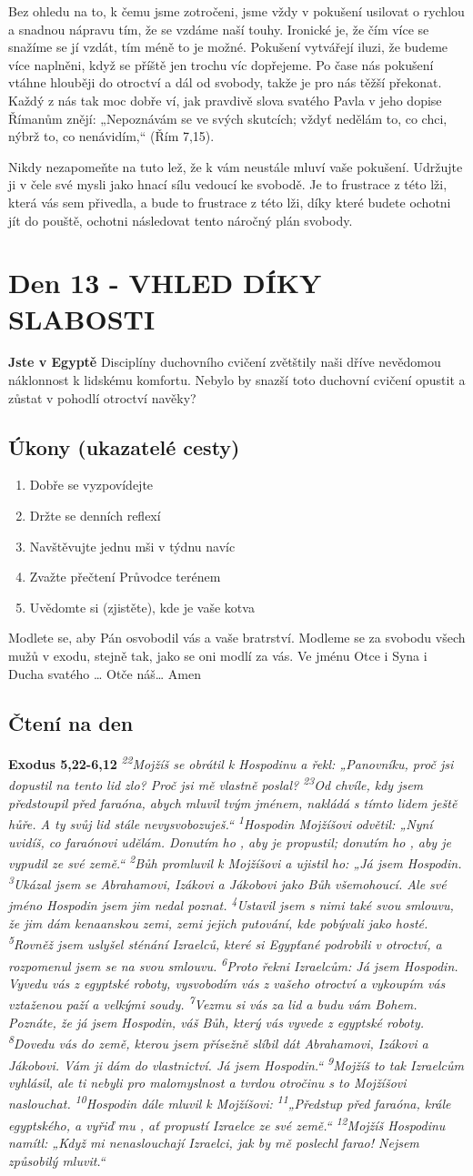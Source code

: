 \documentclass[11pt]{article}
\newcommand{\zacatekDruhyTyden}{
  \textbf{Jste v Egyptě} \newline
  Disciplíny duchovního cvičení zvětštily naši dříve nevědomou náklonnost k lidskému komfortu.
  Nebylo by snazší toto duchovní cvičení opustit a zůstat v pohodlí otroctví navěky?

  \subsection*{Úkony (ukazatelé cesty)}
\begin{enumerate}
  \item Dobře se vyzpovídejte
  \item Držte se denních reflexí
  \item Navštěvujte jednu mši v týdnu navíc
  \item Zvažte přečtení Průvodce terénem
  \item Uvědomte si (zjistěte), kde je vaše kotva
\end{enumerate}
Modlete se, aby Pán osvobodil vás a vaše bratrství. \newline
Modleme se za svobodu všech mužů v exodu, stejně tak, jako se oni modlí za vás.\newline
Ve jménu Otce i Syna i Ducha svatého …  Otče náš… Amen
}
\begin{document}
Bez ohledu na to, k čemu jsme zotročeni, jsme vždy v pokušení usilovat o rychlou a snadnou nápravu tím, že se
vzdáme naší touhy. Ironické je, že čím více se snažíme se jí vzdát, tím méně to je možné. Pokušení vytvářejí iluzi,
že budeme více naplněni, když se příště jen trochu víc dopřejeme. Po čase nás pokušení vtáhne hlouběji do otroctví
a dál od svobody, takže je pro nás těžší překonat. Každý z nás tak moc dobře ví, jak pravdivě slova svatého Pavla v
jeho dopise Římanům znějí: „Nepoznávám se ve svých skutcích; vždyť nedělám to, co chci, nýbrž to, co
nenávidím,“ (Řím 7,15).

Nikdy nezapomeňte na tuto lež, že k vám neustále mluví vaše pokušení. Udržujte ji v čele své mysli jako hnací sílu
vedoucí ke svobodě. Je to frustrace z této lži, která vás sem přivedla, a bude to frustrace z této lži, díky které budete
ochotni jít do pouště, ochotni následovat tento náročný plán svobody.

\newpage
\section{Den 13 - VHLED DÍKY SLABOSTI}
\zacatekDruhyTyden
\subsection*{Čtení na den}
\textbf{Exodus 5,22-6,12}
\newline
\textit{
\textsuperscript{22}Mojžíš se obrátil k Hospodinu a řekl: „Panovníku, proč jsi dopustil na tento lid zlo? Proč jsi mě vlastně poslal?
\textsuperscript{23}Od chvíle, kdy jsem předstoupil před faraóna, abych mluvil tvým jménem, nakládá s tímto lidem ještě hůře. A ty svůj lid stále nevysvobozuješ.“
\textsuperscript{1}Hospodin Mojžíšovi odvětil: „Nyní uvidíš, co faraónovi udělám. Donutím ho , aby je propustil; donutím ho , aby je vypudil ze své země.“
\textsuperscript{2}Bůh promluvil k Mojžíšovi a ujistil ho: „Já jsem Hospodin.
\textsuperscript{3}Ukázal jsem se Abrahamovi, Izákovi a Jákobovi jako Bůh všemohoucí. Ale své jméno Hospodin jsem jim nedal poznat.
\textsuperscript{4}Ustavil jsem s nimi také svou smlouvu, že jim dám kenaanskou zemi, zemi jejich putování, kde pobývali jako hosté.
\textsuperscript{5}Rovněž jsem uslyšel sténání Izraelců, které si Egypťané podrobili v otroctví, a rozpomenul jsem se na svou smlouvu.
\textsuperscript{6}Proto řekni Izraelcům: Já jsem Hospodin. Vyvedu vás z egyptské roboty, vysvobodím vás z vašeho otroctví a vykoupím vás vztaženou paží a velkými soudy.
\textsuperscript{7}Vezmu si vás za lid a budu vám Bohem. Poznáte, že já jsem Hospodin, váš Bůh, který vás vyvede z egyptské roboty.
\textsuperscript{8}Dovedu vás do země, kterou jsem přísežně slíbil dát Abrahamovi, Izákovi a Jákobovi. Vám ji dám do vlastnictví. Já jsem Hospodin.“
\textsuperscript{9}Mojžíš to tak Izraelcům vyhlásil, ale ti nebyli pro malomyslnost a tvrdou otročinu s to Mojžíšovi naslouchat.
\textsuperscript{10}Hospodin dále mluvil k Mojžíšovi:
\textsuperscript{11}„Předstup před faraóna, krále egyptského, a vyřiď mu , ať propustí Izraelce ze své země.“
\textsuperscript{12}Mojžíš Hospodinu namítl: „Když mi nenaslouchají Izraelci, jak by mě poslechl farao! Nejsem způsobilý mluvit.“
}
\end{document}
